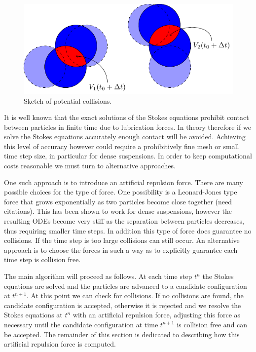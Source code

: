 \documentclass[preprint, 10pt]{elsarticle}
\begin{document}
\begin{figure}[!h]\label{fig:collision_sketch}
\begin{center}
\includegraphics{figures/collisions.pdf}
\end{center}
\caption{Sketch of potential collisions.}
\end{figure}
It is well known that the exact solutions of the Stokes equations prohibit contact between particles in finite time due to lubrication forces. In theory therefore if we solve the Stokes equations accurately enough contact will be avoided. Achieving this level of accuracy however could require a prohibitively fine mesh or small time step size, in particular for dense suspensions. In order to keep computational costs reasonable we must turn to alternative approaches. 

One such approach is to introduce an artificial repulsion force. There are many possible choices for the type of force. One possibility is a Leonard-Jones type force that grows exponentially as two particles become close together (need citations). This has been shown to work for dense suspensions, however the resulting ODEs become very stiff as the separation between particles decreases, thus requiring smaller time steps. In addition this type of force does guarantee no collisions. If the time step is too large collisions can still occur. An alternative approach is to choose the forces in such a way as to explicitly guarantee each time step is collision free. 

The main algorithm will proceed as follows. At each time step $t^n$ the Stokes equations are solved and the particles are advanced to a candidate configuration at $t^{n+1}$. At this point we can check for collisions. If no collisions are found, the candidate configuration is accepted, otherwise it is rejected and we resolve the Stokes equations at $t^n$ with an artificial repulsion force, adjusting this force as necessary until the candidate configuration at time $t^{n+1}$ is collision free and can be accepted. The remainder of this section is dedicated to describing how this artificial repulsion force is computed. 
\end{document}

